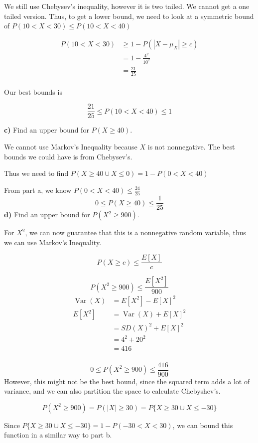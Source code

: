 \documentclass[11pt]{article}
\DeclareMathOperator{\Var}{Var} %
\begin{document}
We still use Chebysev's inequality, however it is two tailed. We cannot get a one tailed version. Thus, to get a lower bound, we need to look at a symmetric bound of $ P(10 < X < 30) \le P(10 < X < 40 )$ 

\begin{align*}
	P(10 < X < 30) &\ge 1- P(|X - \mu _{X}| \ge c) \\
	&= 1 - \frac{4^{2}}{10^{2}} \\
	&= \frac{21}{25} \\
\end{align*}

Our best bounds is 

\[
	\boxed{\frac{21}{25} \le P(10<X<40) \le 1}
\]


\textbf{c)} Find an upper bound for \(P(X \ge 40)\).

We cannot use Markov's Inequality because $ X $ is not nonnegative. The best bounds we could have is from Chebysev's. 

Thus we need to find $ P(X \ge 40 \cup X \le 0) = 1 - P(0<X<40) $ 

From part a, we know $ P(0<X<40) \le \frac{24}{25}$ 
\[
	\boxed{0 \le P(X\ge{40}) \le \frac{1}{25}}
\]
\textbf{d)} Find an upper bound for \(P(X^2 \ge 900)\).

For $ X^{2} $, we can now guarantee that this is a nonnegative random variable, thus we can use Markov's Inequality. 


\[
P(X \ge c) \le \frac{E[X]}{c}
\]

\[
P(X^{2} \ge 900) \le \frac{E[X^{2}]}{900}
\]
\begin{align*}
	\Var(X) &= E[X^{2}] - E[X]^{2} \\ 
	E[X^{2}] &= \Var(X) + E[X]^{2} \\	
	&= SD(X)^{2}  + E[X]^{2} \\
	&= 4^{2} + 20^{2} \\
	&= 416 \\
\end{align*}

\[
0 \le P(X^{2} \ge 900 ) \le \frac{416}{900}
\]
However, this might not be the best bound, since the squared term adds a lot of variance, and we can also partition the space to calculate Chebyshev's. 

\[
	P(X^{2} \ge 900) = P(|X| \ge 30) = P\{X \ge 30 \cup X \le -30 \}
\]

Since $ P\{X \ge 30 \cup X \le -30\} = 1 - P(-30 < X < 30) $, we can bound this function in a similar way to part  b. 
\end{document}
